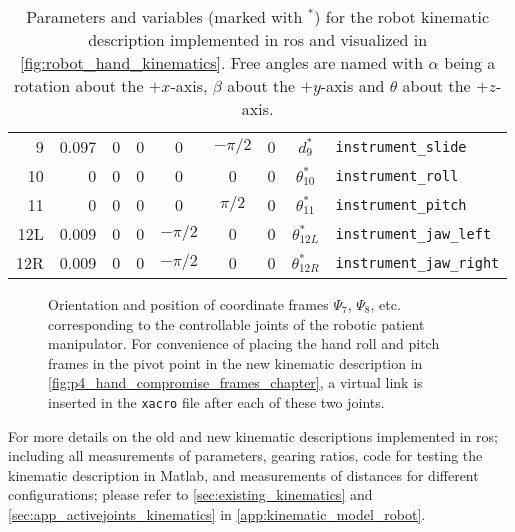 \begin{table}[htbp]
{\begin{tabular}{r | rrr | ccc | c l}
		9 & 0.097 & 0 & 0 & 0 & $-\pi/2$ &  0 & $d_9^*$ & \texttt{instrument\_slide} \\
		10 & 0 & 0 & 0 & 0 & 0 & 0 & $\theta_{10}^*$ & \texttt{instrument\_roll} \\
		11 & 0 & 0 & 0 & 0 & $\pi/2$ & 0 & $\theta_{11}^*$ & \texttt{instrument\_pitch} \\
		12L & 0.009 & 0 & 0 & $-\pi/2$ & 0 & 0 & $\theta_{12L}^*$ & \texttt{instrument\_jaw\_left} \\
		12R & 0.009 & 0 & 0 & $-\pi/2$ & 0 & 0 & $\theta_{12R}^*$ & \texttt{instrument\_jaw\_right} \\
		\end{tabular}\label{tab:new_kin_short}}
	\caption{Parameters and variables (marked with $^*$) for the robot kinematic description implemented in \gls{ros} and visualized in \autoref{fig:robot_hand_kinematics}. Free angles are named with $\alpha$ being a rotation about the $+x$-axis, $\beta$ about the $+y$-axis and $\theta$ about the $+z$-axis.}
	\label{tab:xacro_param_short}
\end{table}

\begin{figure}[htbp]
	\centering
	\vspace*{5mm}
	\caption{Orientation and position of coordinate frames $\Psi_7$, $\Psi_8$, etc. corresponding to the controllable joints of the robotic patient manipulator.  For convenience of placing the hand roll and pitch frames in the pivot point in the new kinematic description in \autoref{fig:p4_hand_compromise_frames_chapter}, a virtual link is inserted in the \texttt{xacro} file after each of these two joints.}
	\label{fig:robot_hand_kinematics}
\end{figure}


For more details on the old and new kinematic descriptions implemented in \gls{ros}; including all measurements of parameters, gearing ratios, code for testing the kinematic description in Matlab, and measurements of distances for different configurations; please refer to \autoref{sec:existing_kinematics} and \ref{sec:app_activejoints_kinematics} in \autoref{app:kinematic_model_robot}.










